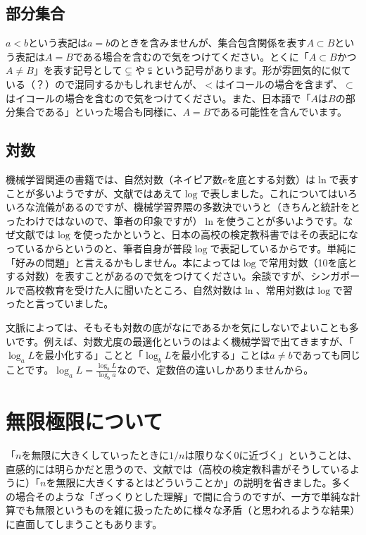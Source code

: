 \documentclass[11pt]{article}
\begin{document}
\subsection{部分集合}
$a<b$という表記は$a=b$のときを含みませんが、集合包含関係を表す$A\subset B$という表記は$A=B$である場合を含むので気をつけてください。とくに「$A\subset B$かつ$A\neq B$」を表す記号として$\subsetneq$や$\subsetneqq$という記号があります。形が雰囲気的に似ている（？）ので混同するかもしれませんが、$<$はイコールの場合を含まず、$\subset$はイコールの場合を含むので気をつけてください。また、日本語で「$A$は$B$の部分集合である」といった場合も同様に、$A=B$である可能性を含んでいます。

\subsection{対数}
機械学習関連の書籍では、自然対数（ネイピア数$e$を底とする対数）は$\ln$で表すことが多いようですが、文献\cite{mle}ではあえて$\log$で表しました。これについてはいろいろな流儀があるのですが、機械学習界隈の多数決でいうと（きちんと統計をとったわけではないので、筆者の印象ですが）$\ln$を使うことが多いようです。なぜ文献\cite{mle}では$\log$を使ったかというと、日本の高校の検定教科書ではその表記になっているからというのと、筆者自身が普段$\log$で表記しているからです。単純に「好みの問題」と言えるかもしません。本によっては$\log$で常用対数（10を底とする対数）を表すことがあるので気をつけてください。余談ですが、シンガポールで高校教育を受けた人に聞いたところ、自然対数は$\ln$、常用対数は$\log$で習ったと言っていました。

文脈によっては、そもそも対数の底がなにであるかを気にしないでよいことも多いです。例えば、対数尤度の最適化というのはよく機械学習で出てきますが、「$\log_a L$を最小化する」ことと「$\log_b L$を最小化する」ことは$a\neq b$であっても同じことです。$\log_a L= \frac{\log_b L}{\log_b a}$なので、定数倍の違いしかありませんから。

\section{無限極限について}

「$n$を無限に大きくしていったときに$1/n$は限りなく0に近づく」ということは、直感的には明らかだと思うので、文献\cite{mle}では（高校の検定教科書がそうしているように）「$n$を無限に大きくするとはどういうことか」の説明を省きました。多くの場合そのような「ざっくりとした理解」で間に合うのですが、一方で単純な計算でも無限というものを雑に扱ったために様々な矛盾（と思われるような結果）に直面してしまうこともあります。
\end{document}
